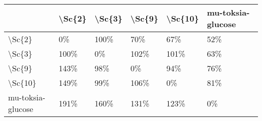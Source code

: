 \begin{tabular}{llllll}
\toprule
{} & \textbackslash Sc\{2\} & \textbackslash Sc\{3\} & \textbackslash Sc\{9\} & \textbackslash Sc\{10\} & mu-toksia-glucose \\
\midrule
\textbackslash Sc\{2\}            &     0\% &   100\% &    70\% &     67\% &               52\% \\
\textbackslash Sc\{3\}            &   100\% &     0\% &   102\% &    101\% &               63\% \\
\textbackslash Sc\{9\}            &   143\% &    98\% &     0\% &     94\% &               76\% \\
\textbackslash Sc\{10\}           &   149\% &    99\% &   106\% &      0\% &               81\% \\
mu-toksia-glucose &   191\% &   160\% &   131\% &    123\% &                0\% \\
\bottomrule
\end{tabular}
